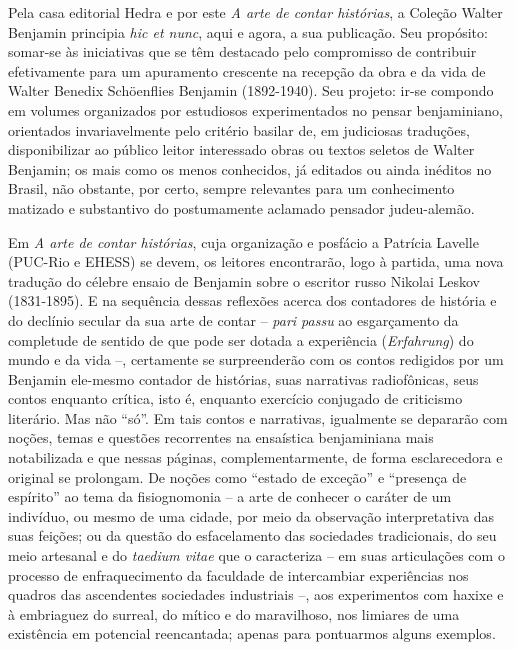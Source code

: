 
Pela casa editorial Hedra e por este \emph{A arte de contar
histórias}, a Coleção Walter Benjamin principia \emph{hic et nunc}, aqui
e agora, a sua publicação. Seu propósito: somar-se às iniciativas que se
têm destacado pelo compromisso de contribuir efetivamente para um
apuramento crescente na recepção da obra e da vida de Walter Benedix
Schöenflies Benjamin (1892-1940). Seu projeto: ir-se compondo em volumes
organizados por estudiosos experimentados no pensar benjaminiano,
orientados invariavelmente pelo critério basilar de, em judiciosas
traduções, disponibilizar ao público leitor interessado obras ou textos
seletos de Walter Benjamin; os mais como os menos conhecidos, já
editados ou ainda inéditos no Brasil, não obstante, por certo, sempre
relevantes para um conhecimento matizado e substantivo do postumamente
aclamado pensador judeu-alemão.

Em \emph{A arte de contar histórias}, cuja organização e posfácio a
Patrícia Lavelle (PUC-Rio e EHESS) se devem, os leitores encontrarão,
logo à partida, uma nova tradução do célebre ensaio de Benjamin sobre o
escritor russo Nikolai Leskov (1831-1895). E na sequência dessas
reflexões acerca dos contadores de história e do declínio secular da sua
arte de contar -- \emph{pari passu} ao esgarçamento da completude de
sentido de que pode ser dotada a experiência (\emph{Erfahrung}) do mundo
e da vida --, certamente se surpreenderão com os contos redigidos por um
Benjamin ele-mesmo contador de histórias, suas narrativas radiofônicas,
seus contos enquanto crítica, isto é, enquanto exercício conjugado de
criticismo literário. Mas não ``só''. Em tais contos e narrativas,
igualmente se depararão com noções, temas e questões recorrentes na
ensaística benjaminiana mais notabilizada e que nessas páginas,
complementarmente, de forma esclarecedora e original se prolongam. De
noções como ``estado de exceção'' e ``presença de espírito'' ao tema da
fisiognomonia -- a arte de conhecer o caráter de um indivíduo, ou mesmo
de uma cidade, por meio da observação interpretativa das suas feições;
ou da questão do esfacelamento das sociedades tradicionais, do seu meio
artesanal e do \emph{taedium vitae} que o caracteriza -- em suas
articulações com o processo de enfraquecimento da faculdade de
intercambiar experiências nos quadros das ascendentes sociedades
industriais --, aos experimentos com haxixe e à embriaguez do surreal,
do mítico e do maravilhoso, nos limiares de uma existência em potencial
reencantada; apenas para pontuarmos alguns exemplos.


